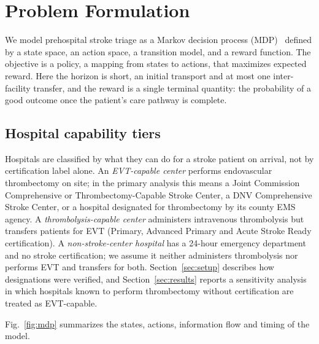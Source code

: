 \section{Problem Formulation}
\label{sec:problem}

We model prehospital stroke triage as a Markov decision process (MDP)~\cite{bellman1957,kochenderfer2022} defined by a state space, an action space, a transition model, and a reward function. The objective is a policy, a mapping from states to actions, that maximizes expected reward. Here the horizon is short, an initial transport and at most one inter-facility transfer, and the reward is a single terminal quantity: the probability of a good outcome once the patient's care pathway is complete.

\subsection{Hospital capability tiers}
Hospitals are classified by what they can do for a stroke patient on arrival, not by certification label alone. An \emph{EVT-capable center} performs endovascular thrombectomy on site; in the primary analysis this means a Joint Commission Comprehensive or Thrombectomy-Capable Stroke Center, a DNV Comprehensive Stroke Center, or a hospital designated for thrombectomy by its county EMS agency. A \emph{thrombolysis-capable center} administers intravenous thrombolysis but transfers patients for EVT (Primary, Advanced Primary and Acute Stroke Ready certification). A \emph{non-stroke-center hospital} has a 24-hour emergency department and no stroke certification; we assume it neither administers thrombolysis nor performs EVT and transfers for both. Section~\ref{sec:setup} describes how designations were verified, and Section~\ref{sec:results} reports a sensitivity analysis in which hospitals known to perform thrombectomy without certification are treated as EVT-capable.

Fig.~\ref{fig:mdp} summarizes the states, actions, information flow and timing of the model.

